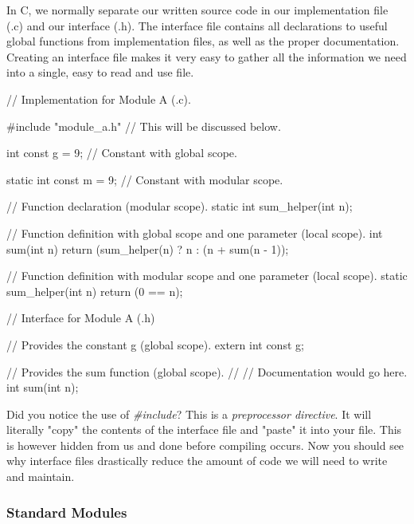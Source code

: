 In C, we normally separate our written source code in our implementation file (.c) and our interface (.h).  The interface file contains all declarations to useful global functions from implementation files, as well as the proper documentation.  Creating an interface file makes it very easy to gather all the information we need into a single, easy to read and use file.\\


\begin{code}[C]
// Implementation for Module A (.c).

#include "module_a.h" // This will be discussed below.

int const g = 9; // Constant with global scope.

static int const m = 9; // Constant with modular scope.

// Function declaration (modular scope).
static int sum_helper(int n);

// Function definition with global scope and one parameter (local scope).
int sum(int n) 
{
	return (sum_helper(n) ? n : (n + sum(n - 1));
}

// Function definition with modular scope and one parameter (local scope).
static sum_helper(int n)
{
	return (0 == n);
}
\end{code}

\begin{code}[C]
// Interface for Module A (.h)

// Provides the constant g (global scope).
extern int const g;

// Provides the sum function (global scope).
//
// Documentation would go here.
int sum(int n);
\end{code}

Did you notice the use of \emph{\#include}? This is a \emph{preprocessor directive}. It will literally "copy" the contents of the interface file and "paste" it into your file. This is however hidden from us and done before compiling occurs. Now you should see why interface files drastically reduce the amount of code we will need to write and maintain.\\

\subsubsection*{Standard Modules}


